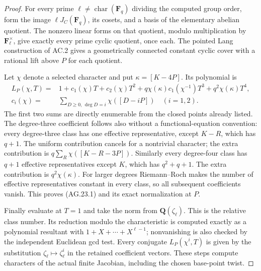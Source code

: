 \begin{proof}
For every prime $\ell\ne\operatorname{char}(\mathbf F_q)$
dividing the computed group order, form the image
$\ell J_C(\mathbf F_q)$, its cosets, and a basis of the
elementary abelian quotient. The nonzero linear forms on
that quotient, modulo multiplication by
$\mathbf F_\ell^\times$, give exactly every prime cyclic
quotient, once each. The pointed Lang construction of AC.2
gives a geometrically connected constant cyclic cover with
a rational lift above $P$ for each quotient.

Let $\chi$ denote a selected character and put
$\kappa=[K-4P]$. Its polynomial is
\[
 \begin{split}
 L_P(\chi,T)={}&1+c_1(\chi)T+c_2(\chi)T^2
       +q\chi(\kappa)c_1(\chi^{-1})T^3
       +q^2\chi(\kappa)T^4,\\
 c_i(\chi)={}&\sum_{D\ge0,\,\deg D=i}\chi([D-iP])
                                      \quad(i=1,2).
 \end{split}                                                   \tag{AG.23.1}
\]
The first two sums are directly enumerable from the closed
points already listed. The degree-three coefficient follows
also without a functional-equation convention: every
degree-three class has one effective representative, except
$K-R$, which has $q+1$. The uniform contribution cancels
for a nontrivial character; the extra contribution is
$q\sum_R\chi([K-R-3P])$. Similarly every degree-four
class has $q+1$ effective representatives except $K$, which
has $q^2+q+1$. The extra contribution is
$q^2\chi(\kappa)$. For larger degrees Riemann--Roch makes
the number of effective representatives constant in every
class, so all subsequent coefficients vanish. This proves
(AG.23.1) and its exact normalization at $P$.

Finally evaluate at $T=1$ and take the norm from
$\mathbf Q(\zeta_\ell)$. This is the relative class number.
Its reduction modulo the characteristic is computed exactly
as a polynomial resultant with
$1+X+\cdots+X^{\ell-1}$; nonvanishing is also checked by
the independent Euclidean gcd test. Every conjugate
$L_P(\chi^i,T)$ is given by the substitution
$\zeta_\ell\mapsto\zeta_\ell^i$ in the retained coefficient
vectors. These steps compute characters of the actual
finite Jacobian, including the chosen base-point twist.
\end{proof}

